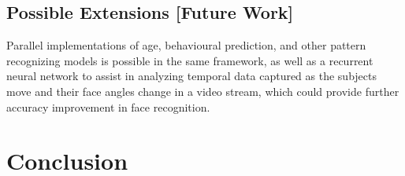 \documentclass[conference]{IEEEtran}
\begin{document}
\subsection{Possible Extensions [Future Work]}
Parallel implementations of age, behavioural prediction, and other pattern recognizing models is possible in the same framework, as well as a recurrent neural network to assist in analyzing temporal data captured as the subjects move and their face angles change in a video stream, which could provide further accuracy improvement in face recognition.

\section{Conclusion}
\end{document}
